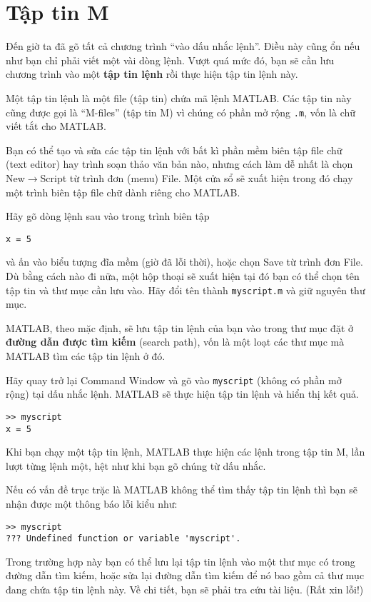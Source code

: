 \documentclass[12pt]{book}
\begin{document}
\section{Tập tin M}

Đến giờ ta đã gõ tất cả chương trình ``vào dấu nhắc lệnh''. Điều này
cũng ổn nếu như bạn chỉ phải viết một vài dòng lệnh. Vượt quá
mức đó, bạn sẽ cần lưu chương trình vào một {\bf tập tin lệnh} rồi
thực hiện tập tin lệnh này.

Một tập tin lệnh là một file (tập tin) chứa mã lệnh MATLAB. Các tập tin
này cũng được gọi là ``M-files'' (tập tin M) vì chúng có phần mở rộng
{\tt .m}, vốn là chữ viết tắt cho MATLAB.

Bạn có thể tạo và sửa các tập tin lệnh với bất kì phần mềm biên tập
file chữ (text editor) hay trình soạn thảo văn bản nào, nhưng cách làm
dễ nhất là chọn {\sf New}$\rightarrow${\sf Script} từ trình đơn (menu) 
{\sf File}. Một cửa sổ sẽ xuất hiện trong đó chạy một trình biên tập
file chữ dành riêng cho MATLAB.

Hãy gõ dòng lệnh sau vào trong trình biên tập 

\begin{verbatim}
x = 5
\end{verbatim}
%
\noindent và ấn vào biểu tượng đĩa mềm (giờ đã lỗi thời), hoặc chọn {\sf Save}
từ trình đơn {\sf File}. Dù bằng cách nào đi nữa, một hộp thoại sẽ 
xuất hiện tại đó bạn có thể chọn tên tập tin và thư mục cần lưu vào. 
Hãy đổi tên thành {\tt myscript.m} và giữ nguyên thư mục.

MATLAB, theo mặc định, sẽ lưu tập tin lệnh của bạn vào trong thư
mục đặt ở {\bf đường dẫn được tìm kiếm} (search path), vốn là một
loạt các thư mục mà MATLAB tìm các tập tin lệnh ở đó.

Hãy quay trở lại Command Window và gõ vào {\tt myscript} (không có
phần mở rộng) tại dấu nhắc lệnh. MATLAB sẽ thực hiện tập tin lệnh
và hiển thị kết quả.

\begin{verbatim}
>> myscript
x = 5
\end{verbatim}
%
Khi bạn chạy một tập tin lệnh, MATLAB thực hiện các lệnh trong tập
tin M, lần lượt từng lệnh một, hệt như khi bạn gõ chúng từ dấu nhắc.

Nếu có vấn đề trục trặc là MATLAB không thể tìm thấy tập tin lệnh
thì bạn sẽ nhận được một thông báo lỗi kiểu như:

\begin{verbatim}
>> myscript
??? Undefined function or variable 'myscript'.
\end{verbatim}
%
Trong trường hợp này bạn có thể lưu lại tập tin lệnh vào một thư mục
có trong đường dẫn tìm kiếm, hoặc sửa lại đường dẫn tìm kiếm để nó
bao gồm cả thư mục đang chứa tập tin lệnh này. Về chi tiết, bạn sẽ phải
tra cứu tài liệu. (Rất xin lỗi!)
\end{document}
